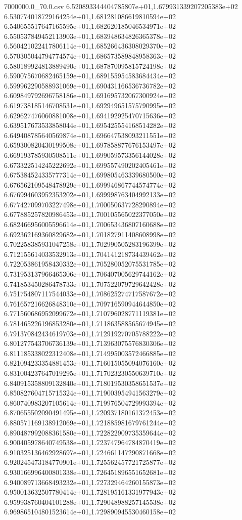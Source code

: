 \begin{filecontents*}{7000000.0_70.0.csv}
6.520893344404785807e+01,1.679931339207205383e+02
6.530774018729164254e+01,1.681281086619810594e+02
6.540655517647165595e+01,1.682620185046534971e+02
6.550537849452113903e+01,1.683948634826365378e+02
6.560421022417806114e+01,1.685266436308029370e+02
6.570305044794774574e+01,1.686573589848958363e+02
6.580189924813889490e+01,1.687870095815724198e+02
6.590075670682465159e+01,1.689155954583684434e+02
6.599962290588931069e+01,1.690431166536736782e+02
6.609849792696758186e+01,1.691695732067300924e+02
6.619738185146708531e+01,1.692949651575790995e+02
6.629627476060881008e+01,1.694192925470715636e+02
6.639517673533858044e+01,1.695425554168514282e+02
6.649408785640569874e+01,1.696647538093211551e+02
6.659300820430199508e+01,1.697858877676153497e+02
6.669193785930508511e+01,1.699059573356144028e+02
6.673322514245222692e+01,1.699557490202405461e+02
6.675384524335777314e+01,1.699805463339680500e+02
6.676562109548478929e+01,1.699946867744574774e+02
6.676994603952353202e+01,1.699998763404992133e+02
6.677427099703227498e+01,1.700050637728290894e+02
6.677885257820986453e+01,1.700105565022377050e+02
6.682466956005596614e+01,1.700653436807160688e+02
6.692362169360829682e+01,1.701827911408608998e+02
6.702258385931047258e+01,1.702990505283196399e+02
6.712155614033532913e+01,1.704141218734439462e+02
6.722053861958430332e+01,1.705280052075531785e+02
6.731953137966465306e+01,1.706407005629744162e+02
6.741853450286478733e+01,1.707522079729642428e+02
6.751754807117544033e+01,1.708625274717587672e+02
6.761657216626848310e+01,1.709716590944644850e+02
6.771560686952099672e+01,1.710796028771119381e+02
6.781465226196853280e+01,1.711863588565674945e+02
6.791370842434619703e+01,1.712919270705788222e+02
6.801277543706736139e+01,1.713963075576830306e+02
6.811185338022312408e+01,1.714995003572466885e+02
6.821094233354881453e+01,1.716015055094076160e+02
6.831004237647019295e+01,1.717023230550639710e+02
6.840915358809132840e+01,1.718019530358651537e+02
6.850827604715715324e+01,1.719003954941563279e+02
6.860740983207105614e+01,1.719976504729993394e+02
6.870655502090491495e+01,1.720937180161372453e+02
6.880571169138912069e+01,1.721885981679761244e+02
6.890487992088361580e+01,1.722822909735359644e+02
6.900405978640749538e+01,1.723747964784870419e+02
6.910325136462928697e+01,1.724661147290871668e+02
6.920245473184770901e+01,1.725562457721725877e+02
6.930166996400801338e+01,1.726451896551652681e+02
6.940089713668493232e+01,1.727329464260155873e+02
6.950013632507780414e+01,1.728195161331977943e+02
6.959938760404101288e+01,1.729048988257145538e+02
6.969865104801523614e+01,1.729890945530460158e+02

\end{filecontents*}
